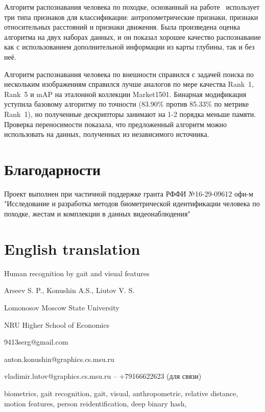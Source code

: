 \documentclass[a4paper,twoside,11pt]{article}
\numberwithin{equation}{section}
\begin{document}
Алгоритм распознавания человека по походке, основанный на работе~\cite{yang2016relative} использует три типа признаков для классификации: антропометрические признаки, признаки относительных расстояний и признаки движения. Была произведена оценка алгоритма на двух наборах данных, и он показал хорошее качество распознавание как с использованием дополнительной информации из карты глубины, так и без неё.

Алгоритм распознавания человека по внешности справился с задачей поиска по нескольким изображениям справился лучше аналогов по мере качества Rank~1, Rank~5 и mAP на эталонной коллекции Market1501. Бинарная модификация уступила базовому алгоритму по точности (83.90\% против 85.33\% по метрике Rank~1), но полученные дескрипторы занимают на 1-2 порядка меньше памяти. Проверка переносимости показала, что предложенный алгоритм можно использовать на данных, полученных из независимого источника.

\section{Благодарности}

Проект выполнен при частичной поддержке гранта РФФИ №16-29-09612 офи-м "Исследование и разработка методов биометрической идентификации человека по походке, жестам и комплекции в данных видеонаблюдения"




\section{English translation}

Human recognition by gait and visual features

Arseev S. P., Konushin A.S., Liutov V. S.

Lomonosov Moscow State University

NRU Higher School of Economics

9413serg@gmail.com

anton.konushin@graphics.cs.msu.ru

vladimir.lutov@graphics.cs.msu.ru -- +79166622623 (для связи)

biometrics, gait recognition, gait, visual, anthropometric, relative distance, motion features, person reidentification, deep binary hash, 
\end{document}
